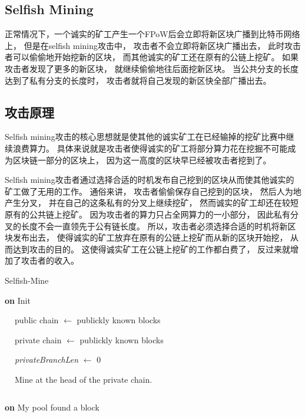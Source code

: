 \documentclass[a4paper, 11pt]{article}
\begin{document}
\begin{CJK*}{UTF8}{gbsn}
    \section{Selfish Mining}

    \indent

    正常情况下，一个诚实的矿工产生一个FPoW后会立即将新区块广播到比特币网络上，
    但是在selfish mining攻击\cite{ref_selfish_mining1}中，
    攻击者不会立即将新区块广播出去，
    此时攻击者可以偷偷地开始挖新的区块，
    而其他诚实的矿工还在原有的公链上挖矿。
    如果攻击者发现了更多的新区块，
    就继续偷偷地往后面挖新区块。
    当公共分支的长度达到了私有分支的长度时，
    攻击者就将自己发现的新区快全部广播出去。

    \subsection{攻击原理}

    \indent

    Selfish mining攻击的核心思想就是使其他的诚实矿工在已经输掉的挖矿比赛中继续浪费算力。
    具体来说就是攻击者使得诚实的矿工将部分算力花在挖掘不可能成为区块链一部分的区块上，
    因为这一高度的区块早已经被攻击者挖到了。

    Selfish mining攻击者通过选择合适的时机发布自己挖到的区块从而使其他诚实的矿工做了无用的工作。
    通俗来讲，
    攻击者偷偷保存自己挖到的区块，
    然后人为地产生分叉，
    并在自己的这条私有的分叉上继续挖矿，
    然而诚实的矿工却还在较短原有的公共链上挖矿。
    因为攻击者的算力只占全网算力的一小部分，
    因此私有分叉的长度不会一直领先于公有链长度。
    所以，攻击者必须选择合适的时机将新区块发布出去，
    使得诚实的矿工放弃在原有的公链上挖矿而从新的区块开始挖，
    从而达到攻击的目的。
    这使得诚实矿工在公链上挖矿的工作都白费了，
    反过来就增加了攻击者的收入。


    \begin{algorithm}
        \caption{Selfish-Mine}

        \textbf{on} Init

            $\ \ \ \ $ public chain  $\leftarrow$ publickly known blocks

            $\ \ \ \ $ private chain $\leftarrow$ publickly known blocks

            $\ \ \ \ $ \textit{privateBranchLen} $\leftarrow$ 0

            $\ \ \ \ $ Mine at the head of the private chain.

        $ $
        
        \textbf{on} My pool found a block


\end{algorithm}
\end{CJK*}
\end{document}
